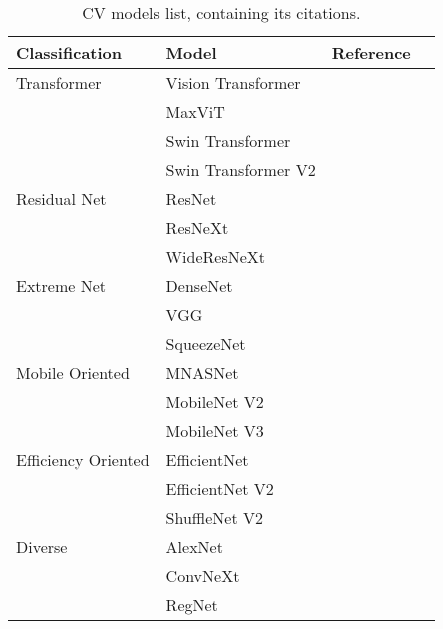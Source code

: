 
\begin{table}
	\centering
	\caption{\acrlong{CV} models list, containing its citations.}
	\begin{tabular}{llcc}
		\toprule	
		Classification 		& Model 		& Reference 			\\
 		\midrule	
		Transformer    		& Vision Transformer	& \cite{VisionTransformer}	\\
			   		& MaxViT		& \cite{MaxViT}			\\
			   		& Swin Transformer	& \cite{SwinTransformer}	\\
			   		& Swin Transformer V2	& \cite{SwinTransformerV2}	\\
		Residual Net   		& ResNet		& \cite{ResNet}			\\
			 		& ResNeXt		& \cite{ResNeXt}		\\
			 		& WideResNeXt		& \cite{WideResNet}		\\
		Extreme Net	   	& DenseNet		& \cite{DenseNet}		\\
				 	& VGG			& \cite{VGG}			\\
					& SqueezeNet		& \cite{SqueezeNet}		\\
		Mobile Oriented		& MNASNet		& \cite{MNASNet}		\\
					& MobileNet V2		& \cite{MobileNetV2}		\\
					& MobileNet V3		& \cite{MobileNetV3}		\\
		Efficiency Oriented	& EfficientNet		& \cite{EfficientNet}		\\
					& EfficientNet V2	& \cite{EfficientNetV2}		\\
					& ShuffleNet V2		& \cite{ShuffleNetV2}		\\
		Diverse		  	& AlexNet		& \cite{AlexNet}		\\
					& ConvNeXt		& \cite{ConvNeXt}		\\
 					& RegNet		& \cite{RegNet}			\\
		\bottomrule
	\end{tabular}
	\label{tab:cv_list}
\end{table}
